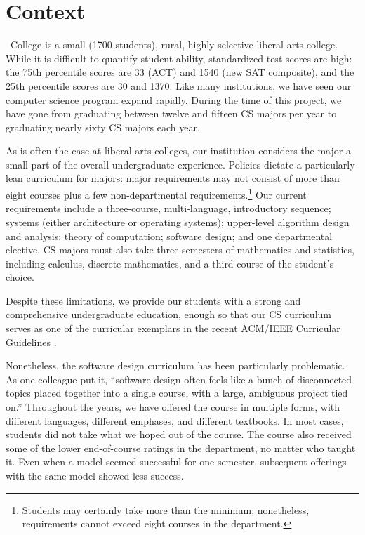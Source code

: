 \section{Context}

\college\ College is a small (1700 students), rural, highly selective
liberal arts college.  While it is difficult to quantify student
ability, standardized test scores are high: the 75th percentile
scores are 33 (ACT) and 1540 (new SAT composite), and the 25th
percentile scores are 30 and 1370.  Like many institutions, we have
seen our computer science program expand rapidly.  During the time
of this project, we have gone from graduating between twelve and
fifteen CS majors per year to graduating nearly sixty CS majors
each year.

As is often the case at liberal arts colleges, our institution
considers the major a small part of the overall undergraduate
experience.  Policies dictate a particularly lean curriculum for
majors: major requirements may not consist of more than eight courses
plus a few non-departmental requirements.\footnote{Students may
certainly take more than the minimum; nonetheless, requirements
cannot exceed eight courses in the department.} Our current
requirements include a three-course, multi-language, introductory
sequence; systems (either architecture or operating systems);
upper-level algorithm design and analysis; theory of computation;
software design; and one departmental elective.  CS majors must
also take three semesters of mathematics and statistics, including
calculus, discrete mathematics, and a third course of the student's
choice.

Despite these limitations, we provide our students with a strong
and comprehensive undergraduate education, enough so that our
CS curriculum serves as one of the curricular exemplars in the
recent ACM/IEEE Curricular Guidelines \cite{curriculum-2013}.

Nonetheless, the software design curriculum has been particularly
problematic.  As one colleague put it, ``software design often feels
like a bunch of disconnected topics placed together into a single
course, with a large, ambiguous project tied on.''  Throughout the
years, we have offered the course in multiple forms, with different
languages, different emphases, and different textbooks.  In most
cases, students did not take what we hoped out of the course.  The
course also received some of the lower end-of-course ratings in the
department, no matter who taught it.  Even when a model seemed
successful for one semester, subsequent offerings with the same
model showed less success.

